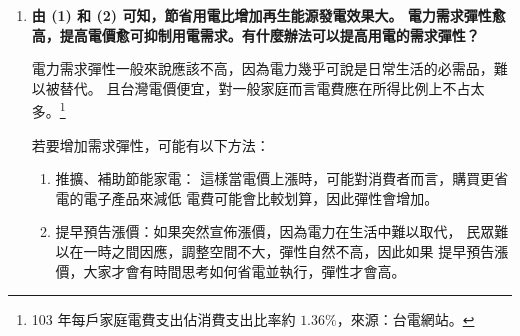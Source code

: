 \documentclass[12pt, a4paper]{article}
\begin{document}
\begin{enumerate}[label=(\arabic*)]
  \item {\bf 由 (1) 和 (2) 可知，節省用電比增加再生能源發電效果大。
      電力需求彈性愈高，提高電價愈可抑制用電需求。有什麼辦法可以提高用電的需求彈性？}

    電力需求彈性一般來說應該不高，因為電力幾乎可說是日常生活的必需品，難以被替代。
    且台灣電價便宜，對一般家庭而言電費應在所得比例上不占太多。\footnote{103 年每戶家庭電費支出佔消費支出比率約
      $1.36 \%$，來源：台電網站。}

		若要增加需求彈性，可能有以下方法：
    \begin{enumerate}[label=\arabic*.]
      \item 推擴、補助節能家電：
        這樣當電價上漲時，可能對消費者而言，購買更省電的電子產品來減低
        電費可能會比較划算，因此彈性會增加。
      \item 提早預告漲價：如果突然宣佈漲價，因為電力在生活中難以取代，
        民眾難以在一時之間因應，調整空間不大，彈性自然不高，因此如果
        提早預告漲價，大家才會有時間思考如何省電並執行，彈性才會高。
    \end{enumerate}


\end{enumerate}
\end{document}
